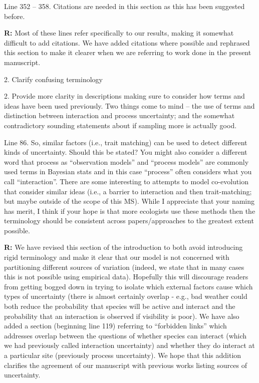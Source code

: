 \documentclass[12pt]{letter}
\newenvironment{refquote}{\bigskip \begin{it}}{\end{it}\smallskip}
\begin{document}
		\begin{refquote}
		Line 352 – 358.  Citations are needed in this section as this has been suggested before.
		\end{refquote}


		\textbf{R:} Most of these lines refer specifically to our results, making it somewhat difficult to add citations. We have added citations where possible and rephrased this section to make it clearer when we are referring to work done in the present manuscript.


	2. Clarify confusing terminology

		\begin{refquote}
		2.      Provide more clarity in descriptions making sure to consider how terms and ideas have been used previously.  Two things come to mind – the use of terms and distinction between interaction and process uncertainty; and the somewhat contradictory sounding statements about if sampling more is actually good.


		Line 86.  So, similar factors (i.e., trait matching) can be used to detect different kinds of uncertainty.  Should this be stated?  You might also consider a different word that process as ``observation models'' and ``process models'' are commonly used terms in Bayesian stats and in this case ``process'' often considers what you call ``interaction''.  There are some interesting to attempts to model co-evolution that consider similar ideas (i.e., a barrier to interaction and then trait-matching; but maybe outside of the scope of this MS). While I appreciate that your naming has merit, I think if your hope is that more ecologists use these methods then the terminology should be consistent across papers/approaches to the greatest extent possible.
		\end{refquote}


		\textbf{R:} We have revised this section of the introduction to both avoid introducing rigid terminology and make it clear that our model is not concerned with partitioning different sources of variation (indeed, we state that in many cases this is not possible using empirical data). Hopefully this will discourage readers from getting bogged down in trying to isolate which external factors cause which types of uncertainty (there is almost certainly overlap - e.g., bad weather could both reduce the probability that species will be active and interact and the probability that an interaction is observed if visibility is poor). We have also added a section (beginning line 119) referring to ``forbidden links'' which addresses overlap between the questions of whether species can interact (which we had previously called interaction uncertainty) and whether they do interact at a particular site (previously process uncertainty). We hope that this addition clarifies the agreement of our manuscript with previous works listing sources of uncertainty.
\end{document}

